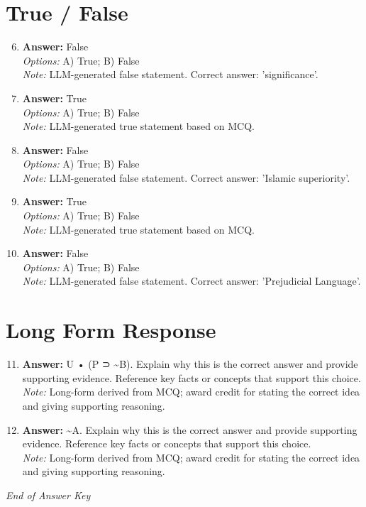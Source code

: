 \documentclass[12pt]{article}
\begin{document}
\section*{True / False}
\begin{enumerate}[label=\arabic*.]
\setcounter{enumi}{5}
\item \textbf{Answer:} False
\\ \textit{Options:} A) True; B) False
\\ \textit{Note:} LLM-generated false statement. Correct answer: 'significance'.
\item \textbf{Answer:} True
\\ \textit{Options:} A) True; B) False
\\ \textit{Note:} LLM-generated true statement based on MCQ.
\item \textbf{Answer:} False
\\ \textit{Options:} A) True; B) False
\\ \textit{Note:} LLM-generated false statement. Correct answer: 'Islamic superiority'.
\item \textbf{Answer:} True
\\ \textit{Options:} A) True; B) False
\\ \textit{Note:} LLM-generated true statement based on MCQ.
\item \textbf{Answer:} False
\\ \textit{Options:} A) True; B) False
\\ \textit{Note:} LLM-generated false statement. Correct answer: 'Prejudicial Language'.
\end{enumerate}

\section*{Long Form Response}
\begin{enumerate}[label=\arabic*.]
\setcounter{enumi}{10}
\item \textbf{Answer:} U • (P ⊃ \textasciitilde{}B). Explain why this is the correct answer and provide supporting evidence. Reference key facts or concepts that support this choice.
\\ \textit{Note:} Long-form derived from MCQ; award credit for stating the correct idea and giving supporting reasoning.
\item \textbf{Answer:} \textasciitilde{}A. Explain why this is the correct answer and provide supporting evidence. Reference key facts or concepts that support this choice.
\\ \textit{Note:} Long-form derived from MCQ; award credit for stating the correct idea and giving supporting reasoning.
\end{enumerate}

\vfill
\noindent\textit{End of Answer Key}
\end{document}
